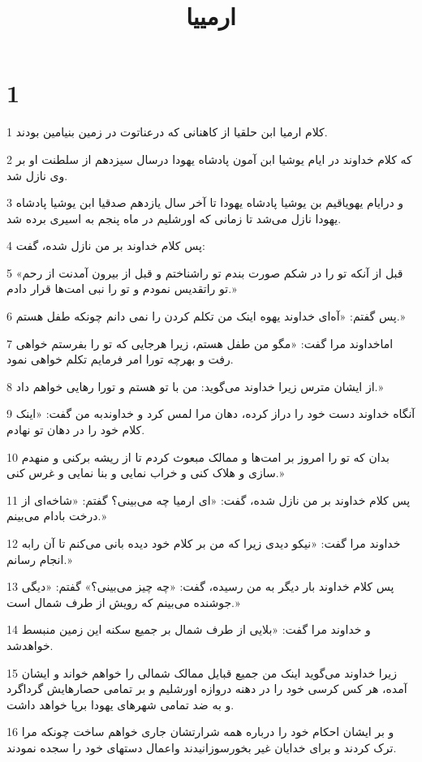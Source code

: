 

\title{ارمييا}

 
\chapter{1}

\par 1 کلام ارمیا ابن حلقیا از کاهنانی که درعناتوت در زمین بنیامین بودند.
\par 2 که کلام خداوند در ایام یوشیا ابن آمون پادشاه یهودا درسال سیزدهم از سلطنت او بر وی نازل شد.
\par 3 و درایام یهویاقیم بن یوشیا پادشاه یهودا تا آخر سال یازدهم صدقیا ابن یوشیا پادشاه یهودا نازل می‌شد تا زمانی که اورشلیم در ماه پنجم به اسیری برده شد.
\par 4 پس کلام خداوند بر من نازل شده، گفت:
\par 5 «قبل از آنکه تو را در شکم صورت بندم تو راشناختم و قبل از بیرون آمدنت از رحم تو راتقدیس نمودم و تو را نبی امت‌ها قرار دادم.»
\par 6 پس گفتم: «آه‌ای خداوند یهوه اینک من تکلم کردن را نمی دانم چونکه طفل هستم.»
\par 7 اماخداوند مرا گفت: «مگو من طفل هستم، زیرا هرجایی که تو را بفرستم خواهی رفت و بهر‌چه تورا امر فرمایم تکلم خواهی نمود.
\par 8 از ایشان مترس زیرا خداوند می‌گوید: من با تو هستم و تورا رهایی خواهم داد.»
\par 9 آنگاه خداوند دست خود را دراز کرده، دهان مرا لمس کرد و خداوندبه من گفت: «اینک کلام خود را در دهان تو نهادم.
\par 10 بدان که تو را امروز بر امت‌ها و ممالک مبعوث کردم تا از ریشه برکنی و منهدم سازی و هلاک کنی و خراب نمایی و بنا نمایی و غرس کنی.»
\par 11 پس کلام خداوند بر من نازل شده، گفت: «ای ارمیا چه می‌بینی؟ گفتم: «شاخه‌ای از درخت بادام می‌بینم.»
\par 12 خداوند مرا گفت: «نیکو دیدی زیرا که من بر کلام خود دیده بانی می‌کنم تا آن رابه انجام رسانم.»
\par 13 پس کلام خداوند بار دیگر به من رسیده، گفت: «چه چیز می‌بینی؟» گفتم: «دیگی جوشنده می‌بینم که رویش از طرف شمال است.»
\par 14 و خداوند مرا گفت: «بلایی از طرف شمال بر جمیع سکنه این زمین منبسط خواهدشد.
\par 15 زیرا خداوند می‌گوید اینک من جمیع قبایل ممالک شمالی را خواهم خواند و ایشان آمده، هر کس کرسی خود را در دهنه دروازه اورشلیم و بر تمامی حصارهایش گرداگرد و به ضد تمامی شهرهای یهودا برپا خواهد داشت.
\par 16 و بر ایشان احکام خود را درباره همه شرارتشان جاری خواهم ساخت چونکه مرا ترک کردند و برای خدایان غیر بخور‌سوزانیدند واعمال دستهای خود را سجده نمودند.

